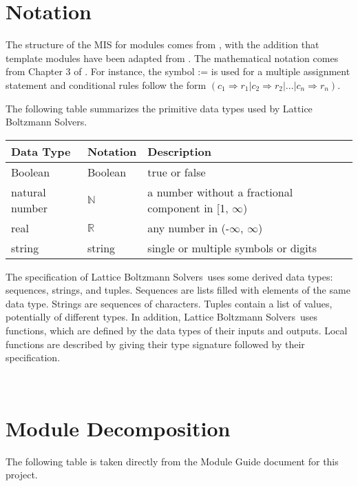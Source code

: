 \documentclass[12pt, titlepage]{article}
\newcommand{\famname}{Lattice Boltzmann Solvers}
\begin{document}
\section{Notation}

The structure of the MIS for modules comes from \citet{HoffmanAndStrooper1995},
with the addition that template modules have been adapted from
\cite{GhezziEtAl2003}.  The mathematical notation comes from Chapter 3 of
\citet{HoffmanAndStrooper1995}.  For instance, the symbol := is used for a
multiple assignment statement and conditional rules follow the form $(c_1
\Rightarrow r_1 | c_2 \Rightarrow r_2 | ... | c_n \Rightarrow r_n )$.

The following table summarizes the primitive data types used by \famname. 

\begin{center}
\renewcommand{\arraystretch}{1.2}
\noindent 
\begin{tabular}{l l p{7.5cm}} 
\toprule 
\textbf{Data Type} & \textbf{Notation} & \textbf{Description}\\ 
\midrule
Boolean & Boolean & true or false\\
natural number & $\mathbb{N}$ & a number without a fractional component in [1, $\infty$) \\
real & $\mathbb{R}$ & any number in (-$\infty$, $\infty$)\\
string & string & single or multiple symbols or digits\\
\bottomrule
\end{tabular} 
\end{center}

\noindent
The specification of \famname \ uses some derived data types: sequences, strings, and
tuples. Sequences are lists filled with elements of the same data type. Strings
are sequences of characters. Tuples contain a list of values, potentially of
different types. In addition, \famname \ uses functions, which
are defined by the data types of their inputs and outputs. Local functions are
described by giving their type signature followed by their specification.

~\newpage

\section{Module Decomposition}

The following table is taken directly from the Module Guide document for this project.
\end{document}
